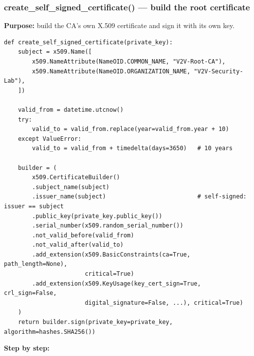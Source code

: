 \documentclass[11pt,a4paper]{report}
\begin{document}
\subsubsection*{create\_self\_signed\_certificate() --- build the root certificate}
\textbf{Purpose:} build the CA's own X.509 certificate and sign it with its own key.
\begin{lstlisting}[style=py,caption={ca/ca.py --- build and self-sign the root
certificate (KeyUsage flags abbreviated with ``...'' for space; in the real
file every flag is written out).}]
def create_self_signed_certificate(private_key):
    subject = x509.Name([
        x509.NameAttribute(NameOID.COMMON_NAME, "V2V-Root-CA"),
        x509.NameAttribute(NameOID.ORGANIZATION_NAME, "V2V-Security-Lab"),
    ])

    valid_from = datetime.utcnow()
    try:
        valid_to = valid_from.replace(year=valid_from.year + 10)
    except ValueError:
        valid_to = valid_from + timedelta(days=3650)   # 10 years

    builder = (
        x509.CertificateBuilder()
        .subject_name(subject)
        .issuer_name(subject)                          # self-signed: issuer == subject
        .public_key(private_key.public_key())
        .serial_number(x509.random_serial_number())
        .not_valid_before(valid_from)
        .not_valid_after(valid_to)
        .add_extension(x509.BasicConstraints(ca=True, path_length=None),
                       critical=True)
        .add_extension(x509.KeyUsage(key_cert_sign=True, crl_sign=False,
                       digital_signature=False, ...), critical=True)
    )
    return builder.sign(private_key=private_key, algorithm=hashes.SHA256())
\end{lstlisting}
\textbf{Step by step:}
\end{document}
